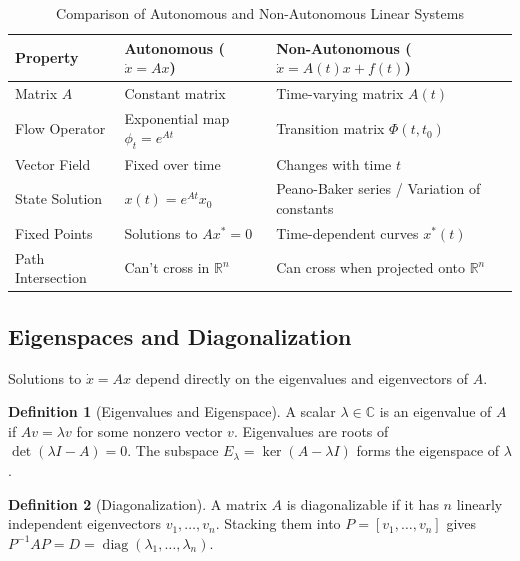 \documentclass[12pt,a4paper,oneside]{article}
\theoremstyle{definition}
\newtheorem{definition}{Definition}[section]
\theoremstyle{plain}
\begin{document}
\vspace{0.3cm}
\begin{table}[htbp]
    \centering
    \caption{Comparison of Autonomous and Non-Autonomous Linear Systems}
    \label{tab:auto_nonauto_comparison_human_v8}
    \small
    \begin{tabular}{p{3.2cm} p{5.5cm} p{5.5cm}}
        \toprule
        \textbf{Property} & \textbf{Autonomous ($\dot{x}=Ax$)} & \textbf{Non-Autonomous ($\dot{x}=A(t)x+f(t)$)} \\
        \midrule
        Matrix $A$ & Constant matrix & Time-varying matrix $A(t)$ \\
        Flow Operator & Exponential map $\phi_t = e^{At}$ & Transition matrix $\Phi(t, t_0)$ \\
        Vector Field & Fixed over time & Changes with time $t$ \\
        State Solution & $x(t) = e^{At} x_0$ & Peano-Baker series / Variation of constants \\
        Fixed Points & Solutions to $Ax^* = 0$ & Time-dependent curves $x^*(t)$ \\
        Path Intersection & Can't cross in $\mathbb{R}^n$ & Can cross when projected onto $\mathbb{R}^n$ \\
        \bottomrule
    \end{tabular}
\end{table}

\subsection{Eigenspaces and Diagonalization}

\vspace{0.15cm}
Solutions to $\dot{x} = Ax$ depend directly on the eigenvalues and eigenvectors of $A$.

\begin{definition}[Eigenvalues and Eigenspace]
A scalar $\lambda \in \mathbb{C}$ is an eigenvalue of $A$ if $Av = \lambda v$ for some nonzero vector $v$. Eigenvalues are roots of $\det(\lambda I - A) = 0$. The subspace $E_\lambda = \ker(A - \lambda I)$ forms the eigenspace of $\lambda$.
\end{definition}

\begin{definition}[Diagonalization]
A matrix $A$ is diagonalizable if it has $n$ linearly independent eigenvectors $v_1, \dots, v_n$. Stacking them into $P = [v_1, \dots, v_n]$ gives $P^{-1} A P = D = \operatorname{diag}(\lambda_1, \dots, \lambda_n)$.
\end{definition}
\end{document}
